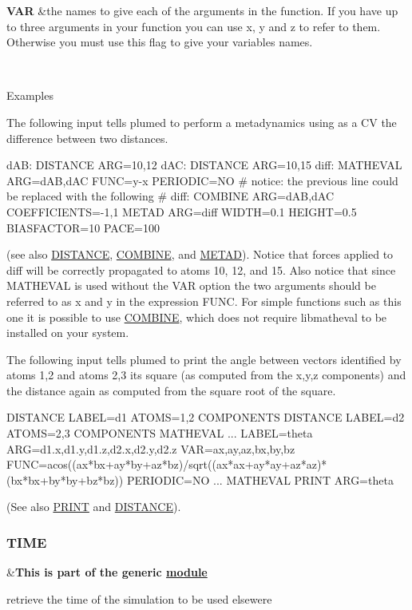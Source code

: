 \begin{TabularC}{2}
\hline
{\bfseries  V\+A\+R } &the names to give each of the arguments in the function. If you have up to three arguments in your function you can use x, y and z to refer to them. Otherwise you must use this flag to give your variables names.  

\\
\end{TabularC}


\begin{DoxyParagraph}{Examples}

\end{DoxyParagraph}
The following input tells plumed to perform a metadynamics using as a C\+V the difference between two distances. \begin{DoxyVerb}dAB: DISTANCE ARG=10,12
dAC: DISTANCE ARG=10,15
diff: MATHEVAL ARG=dAB,dAC FUNC=y-x PERIODIC=NO
# notice: the previous line could be replaced with the following
# diff: COMBINE ARG=dAB,dAC COEFFICIENTS=-1,1
METAD ARG=diff WIDTH=0.1 HEIGHT=0.5 BIASFACTOR=10 PACE=100
\end{DoxyVerb}
 (see also \hyperlink{DISTANCE}{D\+I\+S\+T\+A\+N\+C\+E}, \hyperlink{COMBINE}{C\+O\+M\+B\+I\+N\+E}, and \hyperlink{METAD}{M\+E\+T\+A\+D}). Notice that forces applied to diff will be correctly propagated to atoms 10, 12, and 15. Also notice that since M\+A\+T\+H\+E\+V\+A\+L is used without the V\+A\+R option the two arguments should be referred to as x and y in the expression F\+U\+N\+C. For simple functions such as this one it is possible to use \hyperlink{COMBINE}{C\+O\+M\+B\+I\+N\+E}, which does not require libmatheval to be installed on your system.

The following input tells plumed to print the angle between vectors identified by atoms 1,2 and atoms 2,3 its square (as computed from the x,y,z components) and the distance again as computed from the square root of the square. \begin{DoxyVerb}DISTANCE LABEL=d1 ATOMS=1,2 COMPONENTS
DISTANCE LABEL=d2 ATOMS=2,3 COMPONENTS
MATHEVAL ...
  LABEL=theta
  ARG=d1.x,d1.y,d1.z,d2.x,d2.y,d2.z
  VAR=ax,ay,az,bx,by,bz
  FUNC=acos((ax*bx+ay*by+az*bz)/sqrt((ax*ax+ay*ay+az*az)*(bx*bx+by*by+bz*bz))
  PERIODIC=NO
... MATHEVAL
PRINT ARG=theta
\end{DoxyVerb}
 (See also \hyperlink{PRINT}{P\+R\+I\+N\+T} and \hyperlink{DISTANCE}{D\+I\+S\+T\+A\+N\+C\+E}). \hypertarget{TIME}{}\subsubsection{T\+I\+M\+E}\label{TIME}
\begin{TabularC}{2}
\hline
&{\bfseries  This is part of the generic \hyperlink{mymodules}{module }}   \\
\end{TabularC}
retrieve the time of the simulation to be used elsewere

